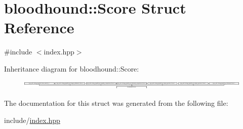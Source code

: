 \hypertarget{structbloodhound_1_1Score}{}\section{bloodhound\+:\+:Score Struct Reference}
\label{structbloodhound_1_1Score}


{\ttfamily \#include $<$index.\+hpp$>$}

Inheritance diagram for bloodhound\+:\+:Score\+:\begin{figure}[H]
\begin{center}
\leavevmode
\includegraphics[height=0.427808cm]{structbloodhound_1_1Score}
\end{center}
\end{figure}


The documentation for this struct was generated from the following file\+:\begin{DoxyCompactItemize}
\item 
include/\hyperlink{index_8hpp}{index.\+hpp}\end{DoxyCompactItemize}
